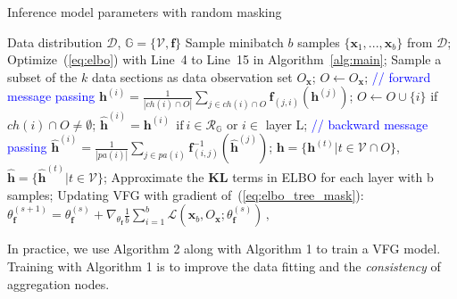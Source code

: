 \documentclass[sigconf, anonymous, review]{acmart}
\theoremstyle{plain}
\theoremstyle{definition}
\theoremstyle{remark}
\begin{document}
\begin{algorithm}%
   \caption{Inference model parameters with random masking}
   \label{alg:rand_mask}
\begin{algorithmic}[1]
    Data distribution $\mathcal{D}$,  $\mathbb{G} = \{\mathcal{V}, \mathbf{f}\}$
   \STATE  Sample minibatch $b$ samples $\{\mathbf{x}_1, ..., \mathbf{x}_b \}$ from $\mathcal{D}$;
   \STATE  
    Optimize~(\ref{eq:elbo}) with Line~4 to Line~15 in Algorithm~\ref{alg:main};
    \STATE  Sample a subset of the $k$ data sections as data observation set $O_{\mathbf{x}}$; $O \leftarrow O_{\mathbf{x}}$;
    \STATE  \textcolor{blue}{// forward message passing}
   \STATE $\mathbf{h}^{(i)} = \frac{1}{|ch(i) \cap O |} \sum_{j \in ch(i) \cap O} \mathbf{f}_{(j,i)}(\mathbf{h}^{(j)})$; 
     \STATE  $O \leftarrow O \cup \{i\}$ if $ch(i) \cap O \neq \emptyset $; 
    \ENDFOR
    \STATE $\widehat{\mathbf{h}}^{(i)} = \mathbf{h}^{(i)} \ \  \text{if} \ i \in \mathcal{R}_{\mathbb{G}} $ or $i \in$ layer L;
   \STATE \textcolor{blue}{// backward message passing}
   \STATE $\widehat{\mathbf{h}}^{(i)} = \frac{1}{|pa(i)|} \sum_{j \in pa(i) } \mathbf{f}^{-1}_{ (i,j)}(\widehat{\mathbf{h}}^{(j)}) $;%
   \ENDFOR
    \STATE  $\mathbf{h} =  \{\mathbf{h}^{(t)} \big |  t \in \mathcal{V} \cap O \}$, $\widehat{\mathbf{h}} =  \{\widehat{\mathbf{h}}^{(t)} \big | t \in \mathcal{V} \}$;
    \STATE Approximate the $\mathbf{KL}$ terms in ELBO for each layer with b samples;
    \STATE Updating VFG with gradient of~(\ref{eq:elbo_tree_mask}): $\theta^{(s+1)}_{\mathbf{f}} = \theta^{(s)}_{\mathbf{f}} + \nabla_{\theta_{\mathbf{f}}}\frac{1}{b} \sum_{i=1}^b  \mathcal{L}(\mathbf{x}_b, O_{\mathbf{x}}; \theta^{(s)}_{\mathbf{f}})   \, ,$
   \ENDFOR
\end{algorithmic}
\end{algorithm}

 In practice, we use Algorithm 2 along with Algorithm 1 to train a VFG model.   Training with Algorithm 1 is to improve the data fitting and the \emph{consistency} of aggregation nodes. 
\end{document}
